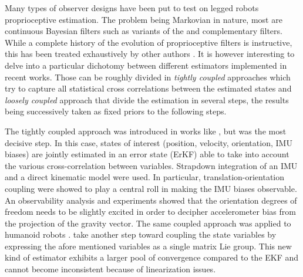 Many types of observer designs have been put to test on legged robots proprioceptive estimation. The problem being Markovian in nature,
most are continuous Bayesian filters such as variants of the \KalmanF \cite{kalman1960new} and complementary filters. While a complete history of 
the evolution of proprioceptive filters is instructive, this has been treated exhaustively by other authors \cite{bloesch2017state, camurri2017multisensory}. 
It is however interesting to delve into a particular dichotomy between different estimators implemented in recent works. Those can be 
roughly divided in \textit{tightly coupled} approaches which try to capture all statistical cross correlations between the estimated states
and \textit{loosely coupled} approach that divide the estimation in several steps, the results being successively taken as fixed priors to the 
following steps.

The tightly coupled approach was introduced in works like \cite{chilian2011multisensor}, but \cite{bloesch2013state} was the most decisive step.
In this case, states of interest (position, velocity, orientation, IMU biases) are jointly estimated in an error state \KalmanF (ErKF) able to take into account
the various cross-correlation between variables. Strapdown integration of an IMU and a direct kinematic model were used. In particular, 
translation-orientation coupling were showed to play a central roll in making the IMU biases observable. An observability analysis and experiments 
showed that the orientation degrees of freedom needs to be slightly excited in order to decipher accelerometer bias from the projection of the 
gravity vector. The same coupled approach was applied to humanoid robots \cite{rotella2014state, fallon2014drift}.
\cite{bledt2018cheetah} take another step toward coupling the state variables by expressing the afore mentioned variables as a single matrix Lie group.
This new kind of estimator exhibits a larger pool of convergence compared to the EKF and cannot become inconsistent because of linearization issues. 

